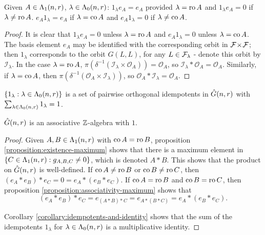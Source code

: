 \documentclass[a4paper, 11pt]{report}
\begin{document}
\begin{lemma}\label{lemma:one-sided-identity}
Given $A\in\Lambda_1(n,r)$, $\lambda\in\Lambda_0(n,r)$: $1_\lambda e_A = e_A$ provided  $\lambda = \operatorname{ro}{A}$ and $1_\lambda e_A = 0$ if $\lambda\neq \operatorname{ro}{A}$. $e_A1_\lambda = e_A$ if $\lambda = \operatorname{co}{A}$ and $e_A 1_\lambda = 0$ if $\lambda \neq \operatorname{co}{A}$.
\end{lemma}
\begin{proof}
It is clear that $1_\lambda e_A=0$ unless $\lambda = \operatorname{ro}{A}$ and $e_A 1_\lambda = 0$ unless $\lambda = \operatorname{co}{A}$. The basis element $e_A$ may be identified with the corresponding orbit in ${\mathcal{F}\!\times\!\mathcal{F}}$; then $1_{\lambda}$ corresponds to the orbit $G(L,L)$, for any $L\in\mathcal{F}_\lambda$ - denote this orbit by $\mathcal{I}_\lambda$. In the case $\lambda = \operatorname{ro}{A}$, $\pi(\delta^{-1}(\mathcal{I}_\lambda\times\mathcal{O}_A)) = \mathcal{O}_A$, so $\mathcal{I}_\lambda\ast \mathcal{O}_A = \mathcal{O}_A$. Similarly, if $\lambda = \operatorname{co}{A}$, then $\pi(\delta^{-1}(\mathcal{O}_A\times\mathcal{I}_\lambda))$, so $\mathcal{O}_A\ast \mathcal{I}_\lambda = \mathcal{O}_A$.
\end{proof}

\begin{corollary}\label{corollary:idempotents-and-identity}
$\{1_\lambda:\lambda\in\Lambda_0(n,r)\}$ is a set of pairwise orthogonal idempotents in $\hat{G}(n,r)$ with $\sum_{\lambda\in\Lambda_0(n,r)}1_\lambda = 1$.
\end{corollary}

\begin{theorem}
$\hat{G}(n,r)$ is an associative $\mathbb{Z}$-algebra with $1$.
\end{theorem}
\begin{proof}
Given $A,B\in\Lambda_1(n,r)$ with $\operatorname{co}{A}=\operatorname{ro}{B}$, proposition \ref{proposition:existence-maximum} shows that there is a maximum element in $\{C\in\Lambda_1(n,r): g_{A,B,C}\neq 0\}$, which is denoted $A\ast B$. This shows that the product on $\hat{G}(n,r)$ is well-defined. If $\operatorname{co}{A}\neq \operatorname{ro}{B}$ or $\operatorname{co}{B}\neq \operatorname{ro}{C}$, then $(e_A\ast e_B)\ast e_C = 0 = e_A\ast (e_B\ast e_C)$. If $\operatorname{co}{A}=\operatorname{ro}{B}$ and $\operatorname{co}{B}=\operatorname{ro}{C}$, then proposition \ref{proposition:associativity-maximum} shows that
\begin{equation*}
(e_A\ast e_B)\ast e_C = e_{(A\ast B)\ast C} = e_{A\ast (B\ast C)} = e_A\ast (e_B\ast e_C).
\end{equation*}

Corollary \ref{corollary:idempotents-and-identity} shows that the sum of the idempotents $1_\lambda$ for $\lambda\in\Lambda_0(n,r)$ is a multiplicative identity.
\end{proof}
\end{document}
